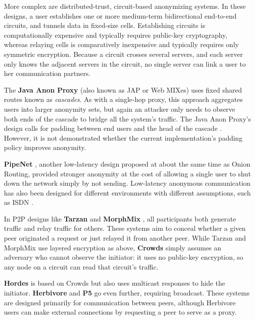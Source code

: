 \documentclass[times,10pt,twocolumn]{article}
\begin{document}
More complex are distributed-trust, circuit-based anonymizing systems.
In these designs, a user establishes one or more medium-term bidirectional
end-to-end circuits, and tunnels data in fixed-size cells.
Establishing circuits is computationally expensive and typically
requires public-key
cryptography, whereas relaying cells is comparatively inexpensive and
typically requires only symmetric encryption.
Because a circuit crosses several servers, and each server only knows
the adjacent servers in the circuit, no single server can link a
user to her communication partners.

The {\bf Java Anon Proxy} (also known as JAP or Web MIXes) uses fixed shared
routes known as \emph{cascades}.  As with a single-hop proxy, this
approach aggregates users into larger anonymity sets, but again an
attacker only needs to observe both ends of the cascade to bridge all
the system's traffic.  The Java Anon Proxy's design 
calls for padding between end users and the head of the cascade
\cite{web-mix}. However, it is not demonstrated whether the current
implementation's padding policy improves anonymity.

{\bf PipeNet} \cite{back01, pipenet}, another low-latency design proposed at
about the same time as Onion Routing, provided
stronger anonymity at the cost of allowing a single user to shut
down the network simply by not sending.  Low-latency anonymous
communication has also been designed for different environments with
different assumptions, such as
ISDN \cite{isdn-mixes}.

In P2P designs like {\bf Tarzan} \cite{tarzan:ccs02} and {\bf MorphMix}
\cite{morphmix:fc04}, all participants both generate traffic and relay
traffic for others. These systems aim to conceal
whether a given peer originated a request
or just relayed it from another peer. While Tarzan and MorphMix use
layered encryption as above, {\bf Crowds} \cite{crowds-tissec} simply assumes
an adversary who cannot observe the initiator: it uses no public-key
encryption, so any node on a circuit can read that circuit's traffic.

{\bf Hordes} \cite{hordes-jcs} is based on Crowds but also uses multicast
responses to hide the initiator. {\bf Herbivore} \cite{herbivore} and
{\bf P5} \cite{p5} go even further, requiring broadcast.
These systems are designed primarily for communication between peers,
although Herbivore users can make external connections by
requesting a peer to serve as a proxy.
\end{document}
